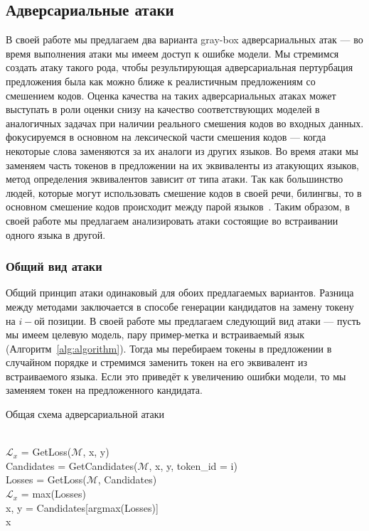 \subsection{Адверсариальные атаки}
В своей работе мы предлагаем два варианта gray-box адверсариальных атак — во время выполнения атаки мы имеем доступ к ошибке модели.
Мы стремимся создать атаку такого рода, чтобы результирующая адверсариальная пертурбация предложения была как можно ближе к реалистичным предложениям со смешением кодов.
Оценка качества на таких адверсариальных атаках может выступать в роли оценки снизу на качество соответствующих моделей в аналогичных задачах при наличии реального смешения кодов во входных данных.
 фокусируемся в основном на лексической части смешения кодов — когда некоторые слова заменяются за их аналоги из других языков.
Во время атаки мы заменяем часть токенов в предложении на их эквиваленты из атакующих языков, метод определения эквивалентов зависит от типа атаки.
Так как большинство людей, которые могут использовать смешение кодов в своей речи, билингвы, то в основном смешение кодов происходит между парой языков~\cite{bilinguals}.
Таким образом, в своей работе мы предлагаем анализировать атаки состоящие во встраивании одного языка в другой.

\subsubsection{Общий вид атаки}
Общий принцип атаки одинаковый для обоих предлагаемых вариантов.
Разница между методами заключается в способе генерации кандидатов на замену токену на $i-$ой позиции.
В своей работе мы предлагаем следующий вид атаки — пусть мы имеем целевую модель, пару пример-метка и встраиваемый язык (Алгоритм~\eqref{alg:algorithm}).
Тогда мы перебираем токены в предложении в случайном порядке и стремимся заменить токен на его эквивалент из встраиваемого языка.
Если это приведёт к увеличению ошибки модели, то мы заменяем токен на предложенного кандидата.

\begin{algorithm}
    \caption{Общая схема адверсариальной атаки}
    \begin{algorithmic}
         \\
        $\mathcal{L}_{x}$ = GetLoss($\mathcal{M}$, x, y)
            \\
            \ind Candidates = GetCandidates($\mathcal{M}$, x, y, token\_id = i) \\
            \ind Losses = GetLoss($\mathcal{M}$, Candidates)
            \ind{}
                    \\
                    \ind\ind$\mathcal{L}_{x}$ = max(Losses) \\
                    \ind\ind x, y = Candidates[argmax(Losses)]
            \EndIf
        \EndFor \\
        \ind\Return x
    \end{algorithmic}\label{alg:algorithm}
\end{algorithm}


